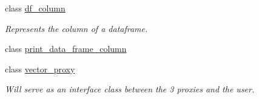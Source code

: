 \begin{DoxyCompactItemize}
class \hyperlink{classboost_1_1numeric_1_1ublas_1_1df__column}{df\+\_\+column}
\begin{DoxyCompactList}\small\item\em Represents the column of a dataframe. \end{DoxyCompactList}\item 
class \hyperlink{classboost_1_1numeric_1_1ublas_1_1print__data__frame__column}{print\+\_\+data\+\_\+frame\+\_\+column}
\item 
class \hyperlink{classboost_1_1numeric_1_1ublas_1_1vector__proxy}{vector\+\_\+proxy}
\begin{DoxyCompactList}\small\item\em Will serve as an interface class between the 3 proxies and the user. \end{DoxyCompactList}\end{DoxyCompactItemize}
